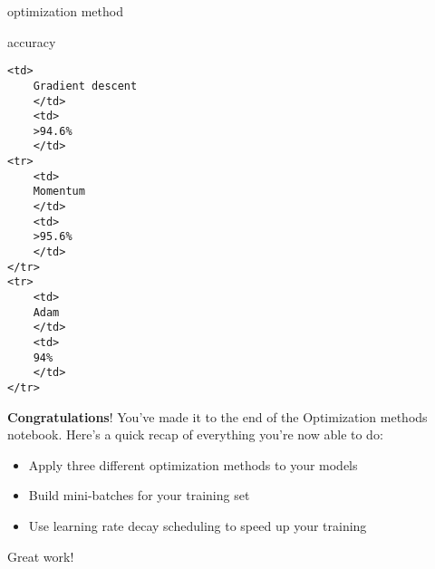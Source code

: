 \documentclass[11pt]{article}
\providecommand{\tightlist}{%
      \setlength{\itemsep}{0pt}\setlength{\parskip}{0pt}}
\begin{document}
optimization method

accuracy

\begin{verbatim}
<td>
    Gradient descent
    </td>
    <td>
    >94.6%
    </td>
<tr>
    <td>
    Momentum
    </td>
    <td>
    >95.6%
    </td>
</tr>
<tr>
    <td>
    Adam
    </td>
    <td>
    94%
    </td>
</tr>
\end{verbatim}

    \textbf{Congratulations}! You've made it to the end of the Optimization
methods notebook. Here's a quick recap of everything you're now able to
do:

\begin{itemize}
\tightlist
\item
  Apply three different optimization methods to your models
\item
  Build mini-batches for your training set
\item
  Use learning rate decay scheduling to speed up your training
\end{itemize}

Great work!


    
    
    
\end{document}
